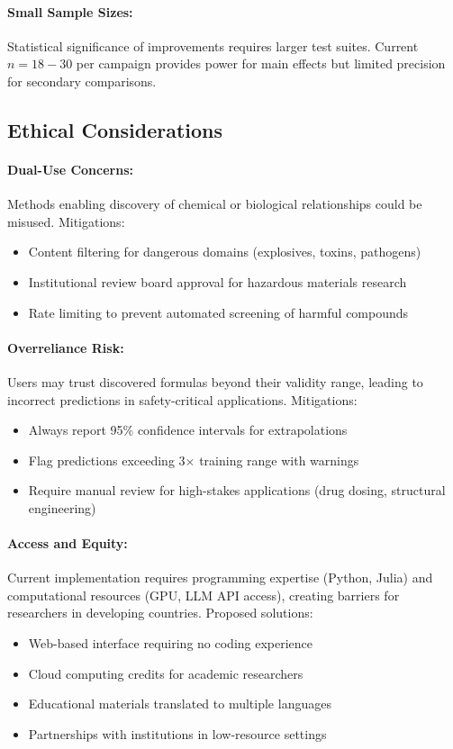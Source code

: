 \paragraph{Small Sample Sizes:} Statistical significance of improvements requires larger test suites. Current $n = 18-30$ per campaign provides power for main effects but limited precision for secondary comparisons.


\subsection{Ethical Considerations}

\paragraph{Dual-Use Concerns:} Methods enabling discovery of chemical or biological relationships could be misused. Mitigations:
\begin{itemize}
\item Content filtering for dangerous domains (explosives, toxins, pathogens)
\item Institutional review board approval for hazardous materials research
\item Rate limiting to prevent automated screening of harmful compounds
\end{itemize}

\paragraph{Overreliance Risk:} Users may trust discovered formulas beyond their validity range, leading to incorrect predictions in safety-critical applications. Mitigations:
\begin{itemize}
\item Always report 95\% confidence intervals for extrapolations
\item Flag predictions exceeding 3$\times$ training range with warnings
\item Require manual review for high-stakes applications (drug dosing, structural engineering)
\end{itemize}

\paragraph{Access and Equity:} Current implementation requires programming expertise (Python, Julia) and computational resources (GPU, LLM API access), creating barriers for researchers in developing countries. Proposed solutions:
\begin{itemize}
\item Web-based interface requiring no coding experience
\item Cloud computing credits for academic researchers
\item Educational materials translated to multiple languages
\item Partnerships with institutions in low-resource settings
\end{itemize}

